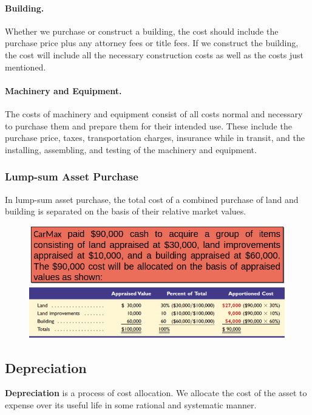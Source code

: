 \documentclass[../main.tex]{subfiles}
\begin{document}
	\paragraph{Building.} Whether we purchase or construct a building, the cost 
	should include the purchase price plus any attorney fees or title fees. If 
	we construct the building, the cost will include all the necessary 
	construction costs as well as the costs just mentioned.
	
	\paragraph{Machinery and Equipment.} The costs of machinery and equipment 
	consist of all costs normal and necessary to purchase them and prepare them 
	for their intended use. These include the purchase price, taxes, 
	transportation charges, insurance while in transit, and the installing, 
	assembling, and testing of the machinery and equipment.
	
	\subsubsection{Lump-sum Asset Purchase}
	
	In lump-sum asset purchase, the total cost of a combined purchase of land 
	and building is separated on the basis of their relative market values.
	
	\begin{figure}[ht]
		\centering
		\includegraphics[width=\columnwidth]{images/c8/lump_sum_purchase_eg.png}
	\end{figure}
	
	\subsection{Depreciation}
	
	\textbf{Depreciation} is a process of cost allocation. We allocate the cost 
	of the asset to expense over its useful life in some rational and 
	systematic manner. 
	
\end{document}
